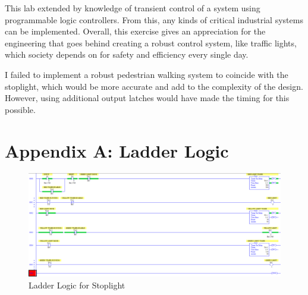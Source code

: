 \documentclass{article}
\begin{document}
This lab extended by knowledge of transient control of a system using programmable logic controllers. From this, any kinds of critical industrial systems can be implemented. Overall, this exercise gives an appreciation for the engineering that goes behind creating a robust control system, like traffic lights, which society depends on for safety and efficiency every single day.

I failed to implement a robust pedestrian walking system to coincide with the stoplight, which would be more accurate and add to the complexity of the design. However, using additional output latches would have made the timing for this possible.

\clearpage

\section*{Appendix A: Ladder Logic}

\begin{figure}[h] 
    \centering
    \includegraphics[width = 15cm]{ladderlogic.png}
    \caption{Ladder Logic for Stoplight}
    \label{fig:ladderlogic}
\end{figure}
\end{document}
